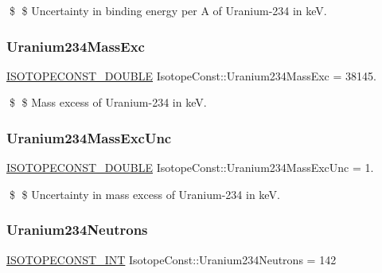 \$ \$ Uncertainty in binding energy per A of Uranium-\/234 in keV. \mbox{\label{group___isotope_const-_uranium-_u234_ga84a741edddafaa8b29c165cd7967248f}} 
\subsubsection{\texorpdfstring{Uranium234\+Mass\+Exc}{Uranium234MassExc}}
{\footnotesize\ttfamily \mbox{\hyperlink{group___isotope_const-_macros_ga8f45a7272ce02c0b4c65c44636ed719a}{I\+S\+O\+T\+O\+P\+E\+C\+O\+N\+S\+T\+\_\+\+D\+O\+U\+B\+LE}} Isotope\+Const\+::\+Uranium234\+Mass\+Exc = 38145.}

\$ \$ Mass excess of Uranium-\/234 in keV. \mbox{\label{group___isotope_const-_uranium-_u234_ga7db5cf61a68b270ecac0d259ff03030a}} 
\subsubsection{\texorpdfstring{Uranium234\+Mass\+Exc\+Unc}{Uranium234MassExcUnc}}
{\footnotesize\ttfamily \mbox{\hyperlink{group___isotope_const-_macros_ga8f45a7272ce02c0b4c65c44636ed719a}{I\+S\+O\+T\+O\+P\+E\+C\+O\+N\+S\+T\+\_\+\+D\+O\+U\+B\+LE}} Isotope\+Const\+::\+Uranium234\+Mass\+Exc\+Unc = 1.}

\$ \$ Uncertainty in mass excess of Uranium-\/234 in keV. \mbox{\label{group___isotope_const-_uranium-_u234_gae9ac5126c38318056cb9f3781b5bd636}} 
\subsubsection{\texorpdfstring{Uranium234\+Neutrons}{Uranium234Neutrons}}
{\footnotesize\ttfamily \mbox{\hyperlink{group___isotope_const-_macros_ga5f18360b3e99483a35c32d789e62621c}{I\+S\+O\+T\+O\+P\+E\+C\+O\+N\+S\+T\+\_\+\+I\+NT}} Isotope\+Const\+::\+Uranium234\+Neutrons = 142}

